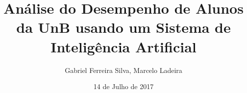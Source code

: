 \documentclass{beamer}
\title{Análise do Desempenho de Alunos da UnB usando um Sistema de Inteligência
Artificial}
\author{Gabriel Ferreira Silva\inst{1}, Marcelo Ladeira\inst{1}}
\institute[Universidade de Brasília] %
{
  \inst{1}%
  Departamento de Ciência da Computação \\
  Universidade de Brasília
}
\date{14 de Julho de 2017}
\begin{document}
\begin{frame}
  \titlepage
\end{frame}







\end{document}
